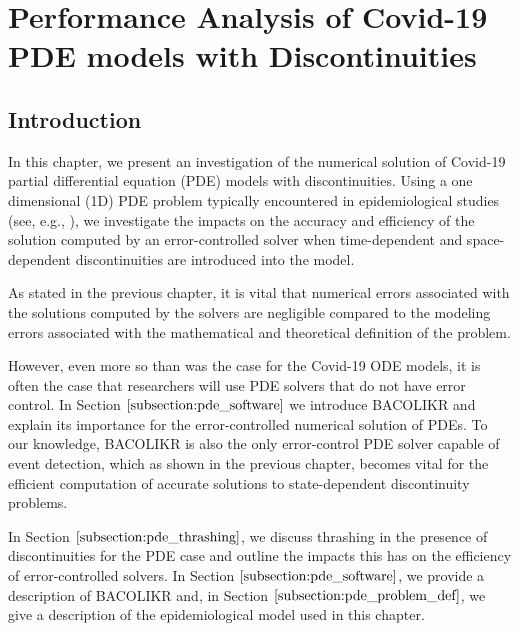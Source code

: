 %
%

\chapter{Performance Analysis of Covid-19 PDE models with Discontinuities}
\label{chapter:pde}
\section{Introduction}
\label{subsection:pde_intro}
In this chapter, we present an investigation of the numerical solution of Covid-19 partial differential equation (PDE) models with discontinuities. Using a one dimensional (1D) PDE problem typically encountered in epidemiological studies (see, e.g., \cite{MR4126357}), we investigate the impacts on the accuracy and efficiency of the solution computed by an error-controlled solver when time-dependent and space-dependent discontinuities are introduced into the model.

As stated in the previous chapter, it is vital that numerical errors associated with the solutions computed by the solvers are negligible compared to the modeling errors associated with the mathematical and theoretical definition of the problem.

However, even more so than was the case for the Covid-19 ODE models, it is often the case that researchers will use PDE solvers that do not have error control. In Section $\ref{subsection:pde_software}$ we introduce BACOLIKR \cite{bacolikr} and explain its importance for the error-controlled numerical solution of PDEs. To our knowledge, BACOLIKR is also the only error-control PDE solver capable of event detection, which as shown in the previous chapter, becomes vital for the efficient computation of accurate solutions to state-dependent discontinuity problems.

In Section $\ref{subsection:pde_thrashing}$, we discuss thrashing in the presence of discontinuities for the PDE case and outline the impacts this has on the efficiency of error-controlled solvers. In Section $\ref{subsection:pde_software}$, we provide a description of BACOLIKR and, in Section $\ref{subsection:pde_problem_def}$, we give a description of the epidemiological model used in this chapter.

